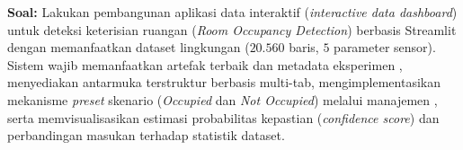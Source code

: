 \documentclass[a4paper,oneside,11pt]{book}
\begin{document}
\par \textbf{Soal:} Lakukan pembangunan aplikasi data interaktif (\textit{interactive data dashboard}) untuk deteksi keterisian ruangan (\textit{Room Occupancy Detection}) berbasis Streamlit dengan memanfaatkan dataset lingkungan  ($20.560$ baris, $5$ parameter sensor). Sistem wajib memanfaatkan artefak terbaik  dan metadata eksperimen , menyediakan antarmuka terstruktur berbasis multi-tab, mengimplementasikan mekanisme \textit{preset} skenario (\textit{Occupied} dan \textit{Not Occupied}) melalui manajemen , serta memvisualisasikan estimasi probabilitas kepastian (\textit{confidence score}) dan perbandingan masukan terhadap statistik dataset.
\end{document}
